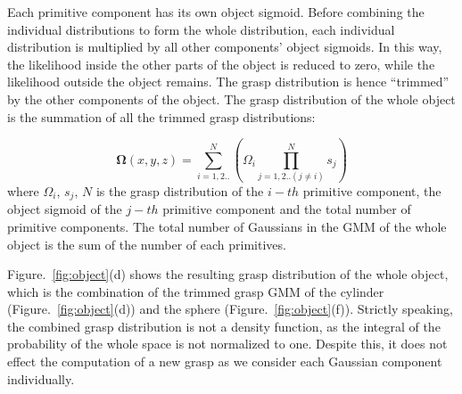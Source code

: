 Each primitive component has its own object sigmoid. Before combining the individual distributions to form the whole distribution, each individual distribution is multiplied by all other components' object sigmoids. In this way, the likelihood inside the other parts of the object is reduced to zero, while the likelihood outside the object remains. The grasp distribution is hence ``trimmed'' by the other components of the object. The grasp distribution of the whole object is the summation of all the trimmed grasp distributions:

\begin{equation}
\boldsymbol{\Omega}\left(x,y,z\right) = \sum_{i=1,2..}^{N}\left(\Omega_i\prod_{j=1,2..\left(j\neq{i}\right)}^{N}s_j\right)
\end{equation}
where $\Omega_i$, $s_j$, $N$ is the grasp distribution of the $i-th$ primitive component, the object sigmoid of the $j-th$ primitive component and the total number of primitive components. The total number of Gaussians in the GMM of the whole object is the sum of the number of each primitives.

Figure.~\ref{fig:object}(d) shows the resulting grasp distribution of the whole object, which is the combination of the trimmed grasp GMM of the cylinder (Figure.~\ref{fig:object}(d)) and the sphere (Figure.~\ref{fig:object}(f)). Strictly speaking, the combined grasp distribution is not a density function, as the integral of the probability of the whole space is not normalized to one. Despite this, it does not effect the computation of a new grasp as we consider each Gaussian component individually.

